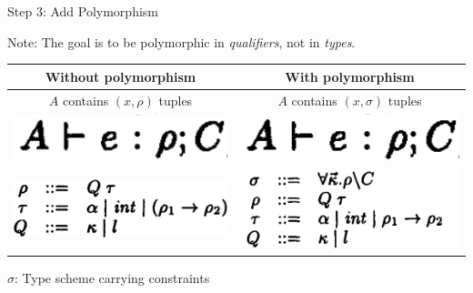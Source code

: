 \documentclass{beamer}
\begin{document}
\begin{frame}{Step 3: Add Polymorphism}

Note: The goal is to be polymorphic in \emph{qualifiers}, not in \emph{types}.

\bigskip

\begin{center}
\begin{tabular}{c | c}
Without polymorphism & With polymorphism \\
\hline
$A$ contains $(x, \rho)$ tuples & $A$ contains $(x, \sigma)$ tuples\\
\hline
\includegraphics[scale=0.65]{paper_constraint_judgment_qualifs.png} & \includegraphics[scale=0.65]{paper_constraint_judgment_qualifs.png}\\
\hline  
\includegraphics[scale=0.65]{paper_figure_3_no_label.png} & \includegraphics[scale=0.65]{paper_poly_types_grammar.png} \\
\hline
\end{tabular}
\end{center}

\bigskip

$\sigma$: Type scheme carrying constraints

\end{frame}
\end{document}
